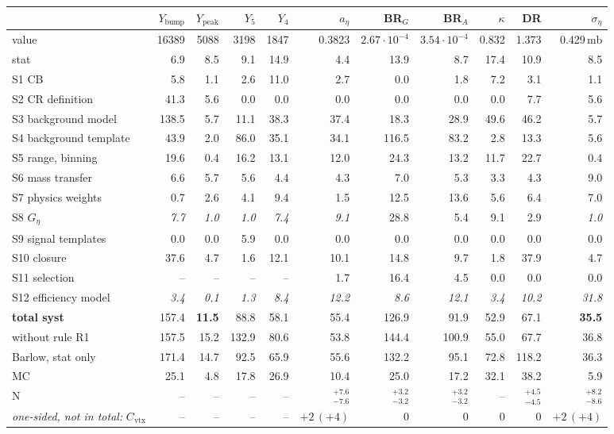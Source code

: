 \begin{tabular}{lrrrrrrrrrr}
\toprule
 & $Y_\mathrm{bump}$ & $Y_\mathrm{peak}$ & $Y_5$ & $Y_4$ & $a_\eta$ & BR$_G$ & BR$_A$ & $\kappa$ & DR & $\sigma_\eta$ \\
\midrule
value & 16389 & 5088 & 3198 & 1847 & 0.3823 & $2.67\cdot10^{-4}$ & $3.54\cdot10^{-4}$ & 0.832 & 1.373 & 0.429\,mb \\
stat & 6.9 & 8.5 & 9.1 & 14.9 & 4.4 & 13.9 & 8.7 & 17.4 & 10.9 & 8.5 \\
\midrule
S1 CB & 5.8 & 1.1 & 2.6 & 11.0 & 2.7 & 0.0 & 1.8 & 7.2 & 3.1 & 1.1 \\
S2 CR definition & 41.3 & 5.6 & 0.0 & 0.0 & 0.0 & 0.0 & 0.0 & 0.0 & 7.7 & 5.6 \\
S3 background model & 138.5 & 5.7 & 11.1 & 38.3 & 37.4 & 18.3 & 28.9 & 49.6 & 46.2 & 5.7 \\
S4 background template & 43.9 & 2.0 & 86.0 & 35.1 & 34.1 & 116.5 & 83.2 & 2.8 & 13.3 & 5.6 \\
S5 range, binning & 19.6 & 0.4 & 16.2 & 13.1 & 12.0 & 24.3 & 13.2 & 11.7 & 22.7 & 0.4 \\
S6 mass transfer & 6.6 & 5.7 & 5.6 & 4.4 & 4.3 & 7.0 & 5.3 & 3.3 & 4.3 & 9.0 \\
S7 physics weights & 0.7 & 2.6 & 4.1 & 9.4 & 1.5 & 12.5 & 13.6 & 5.6 & 6.4 & 7.0 \\
S8 $G_\eta$ & \textit{7.7} & \textit{1.0} & \textit{1.0} & \textit{7.4} & \textit{9.1} & 28.8 & 5.4 & 9.1 & 2.9 & \textit{1.0} \\
S9 signal templates & 0.0 & 0.0 & 5.9 & 0.0 & 0.0 & 0.0 & 0.0 & 0.0 & 0.0 & 0.0 \\
S10 closure & 37.6 & 4.7 & 1.6 & 12.1 & 10.1 & 14.8 & 9.7 & 1.8 & 37.9 & 4.7 \\
S11 selection & -- & -- & -- & -- & 1.7 & 16.4 & 4.5 & 0.0 & 0.0 & 0.0 \\
S12 efficiency model & \textit{3.4} & \textit{0.1} & \textit{1.3} & \textit{8.4} & \textit{12.2} & \textit{8.6} & \textit{12.1} & \textit{3.4} & \textit{10.2} & \textit{31.8} \\
\midrule
\textbf{total syst} & 157.4 & \textbf{11.5} & 88.8 & 58.1 & 55.4 & 126.9 & 91.9 & 52.9 & 67.1 & \textbf{35.5} \\
\quad without rule R1 & 157.5 & 15.2 & 132.9 & 80.6 & 53.8 & 144.4 & 100.9 & 55.0 & 67.7 & 36.8 \\
\quad Barlow, stat only & 171.4 & 14.7 & 92.5 & 65.9 & 55.6 & 132.2 & 95.1 & 72.8 & 118.2 & 36.3 \\
MC & 25.1 & 4.8 & 17.8 & 26.9 & 10.4 & 25.0 & 17.2 & 32.1 & 38.2 & 5.9 \\
N & -- & -- & -- & -- & $^{+7.6}_{-7.6}$ & $^{+3.2}_{-3.2}$ & $^{+3.2}_{-3.2}$ & -- & $^{+4.5}_{-4.5}$ & $^{+8.2}_{-8.6}$ \\
\midrule
\textit{one-sided, not in total:} $C_{\mathrm{vtx}}$ & -- & -- & -- & -- & $+2\,(+4)$ & 0 & 0 & 0 & 0 & $+2\,(+4)$ \\
\bottomrule
\end{tabular}
